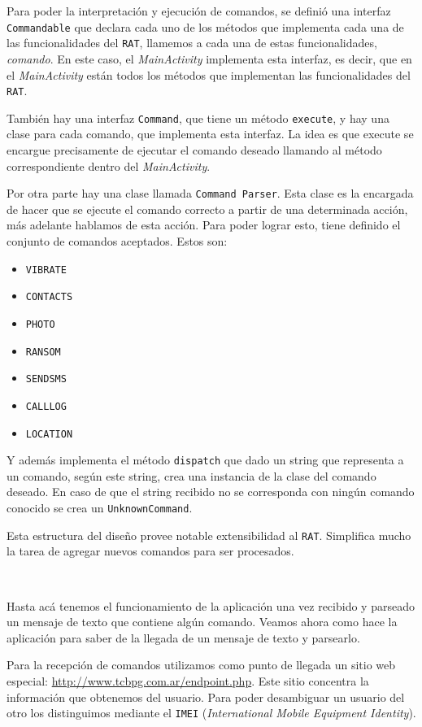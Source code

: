 Para poder la interpretación y ejecución de comandos, se definió una interfaz {\tt Commandable} que declara cada uno de los métodos que implementa cada una de las funcionalidades del \texttt{RAT}, llamemos a cada una de estas funcionalidades, \emph{comando}. En este caso, el \emph{MainActivity} implementa esta interfaz, es decir, que en el \emph{MainActivity} están todos los métodos que implementan las funcionalidades del \texttt{RAT}.

También hay una interfaz {\tt Command}, que tiene un método {\tt execute}, y hay una clase para cada comando, que implementa esta interfaz.
La idea es que execute se encargue precisamente de ejecutar el comando deseado llamando al método correspondiente dentro del \emph{MainActivity}.

Por otra parte hay una clase llamada {\tt Command Parser}. Esta clase es la encargada de hacer que se ejecute el comando correcto a partir de una determinada acción, más adelante hablamos de esta acción. Para poder lograr esto, tiene definido el conjunto de comandos aceptados. Estos son:

\begin{itemize}
\item {\tt VIBRATE}
\item {\tt CONTACTS}
\item {\tt PHOTO}
\item {\tt RANSOM}
\item {\tt SENDSMS}
\item {\tt CALLLOG}
\item {\tt LOCATION}
\end{itemize}

Y además implementa el método {\tt dispatch} que dado un string que representa a un comando, según este string, crea una instancia de la clase del comando deseado. En caso de que el string recibido no se corresponda con ningún comando conocido se crea un {\tt UnknownCommand}.

Esta estructura del diseño provee notable extensibilidad al \texttt{RAT}. Simplifica mucho la tarea de agregar nuevos comandos para ser procesados.

~\newline

Hasta acá tenemos el funcionamiento de la aplicación una vez recibido y parseado un mensaje de texto que contiene algún comando.
Veamos ahora como hace la aplicación para saber de la llegada de un mensaje de texto y parsearlo.

Para la recepción de comandos utilizamos como punto de llegada un sitio web especial: \url{http://www.tcbpg.com.ar/endpoint.php}. Este sitio concentra la información que obtenemos del usuario. Para poder desambiguar un usuario del otro los distinguimos mediante el \texttt{IMEI} (\textit{International Mobile Equipment Identity}).

